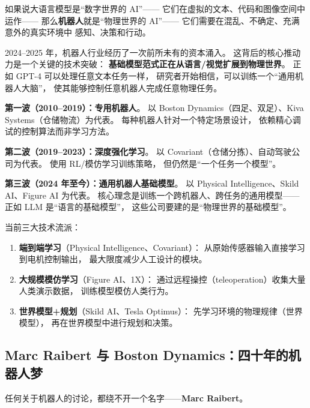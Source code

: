 如果说大语言模型是``数字世界的 AI''——
它们在虚拟的文本、代码和图像空间中运作——
那么\textbf{机器人}就是``物理世界的 AI''——
它们需要在混乱、不确定、充满意外的真实环境中
感知、决策和行动。

2024--2025 年，机器人行业经历了一次前所未有的资本涌入。
这背后的核心推动力是一个关键的技术突破：
\textbf{基础模型范式正在从语言/视觉扩展到物理世界}。
正如 GPT-4 可以处理任意文本任务一样，
研究者开始相信，可以训练一个``通用机器人大脑''，
使其能够控制任意机器人完成任意物理任务。

\begin{keybox}
\textbf{第一波（2010--2019）：专用机器人}。
以 Boston Dynamics（四足、双足）、Kiva Systems（仓储物流）为代表。
每种机器人针对一个特定场景设计，
依赖精心调试的控制算法而非学习方法。

\textbf{第二波（2019--2023）：深度强化学习}。
以 Covariant（仓储分拣）、自动驾驶公司为代表。
使用 RL/模仿学习训练策略，
但仍然是``一个任务一个模型''。

\textbf{第三波（2024 年至今）：通用机器人基础模型}。
以 Physical Intelligence、Skild AI、Figure AI 为代表。
核心理念是训练一个跨机器人、跨任务的通用模型——
正如 LLM 是``语言的基础模型''，
这些公司要建的是``物理世界的基础模型''。

当前三大技术流派：
\begin{enumerate}[noitemsep]
  \item \textbf{端到端学习}（Physical Intelligence、Covariant）：
        从原始传感器输入直接学习到电机控制输出，
        最大限度减少人工设计的模块。
  \item \textbf{大规模模仿学习}（Figure AI、1X）：
        通过远程操控（teleoperation）收集大量人类演示数据，
        训练模型模仿人类行为。
  \item \textbf{世界模型+规划}（Skild AI、Tesla Optimus）：
        先学习环境的物理规律（世界模型），
        再在世界模型中进行规划和决策。
\end{enumerate}
\end{keybox}


\subsection{Marc Raibert 与 Boston Dynamics：四十年的机器人梦}
\label{subsec:marc-raibert}

任何关于机器人的讨论，都绕不开一个名字——\textbf{Marc Raibert}。


